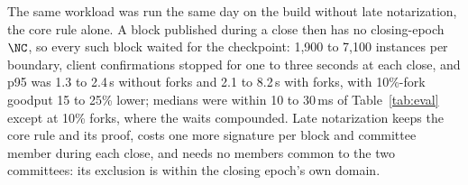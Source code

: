 The same workload was run the same day on the build without late notarization, the core rule alone. A block published during a close then has no closing-epoch $\NC$, so every such block waited for the checkpoint: 1{,}900 to 7{,}100 instances per boundary, client confirmations stopped for one to three seconds at each close, and p95 was 1.3 to 2.4\,s without forks and 2.1 to 8.2\,s with forks, with 10\%-fork goodput 15 to 25\% lower; medians were within 10 to 30\,ms of Table~\ref{tab:eval} except at 10\% forks, where the waits compounded. Late notarization keeps the core rule and its proof, costs one more signature per block and committee member during each close, and needs no members common to the two committees: its exclusion is within the closing epoch's own domain.

